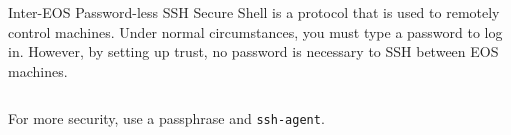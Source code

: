 \begin{block}{Inter-EOS Password-less SSH}
  Secure Shell is a protocol that is used to remotely control machines. Under normal circumstances, you must type a password to log in. However, by setting up trust, no password is necessary to SSH between EOS machines.
  \begin{indented}
    {\scriptsize \inputminted[tabsize=2,frame=single]{bash}{../common/ssh.bash}}
  \end{indented}
  For more security, use a passphrase and \texttt{ssh-agent}.
\end{block}

